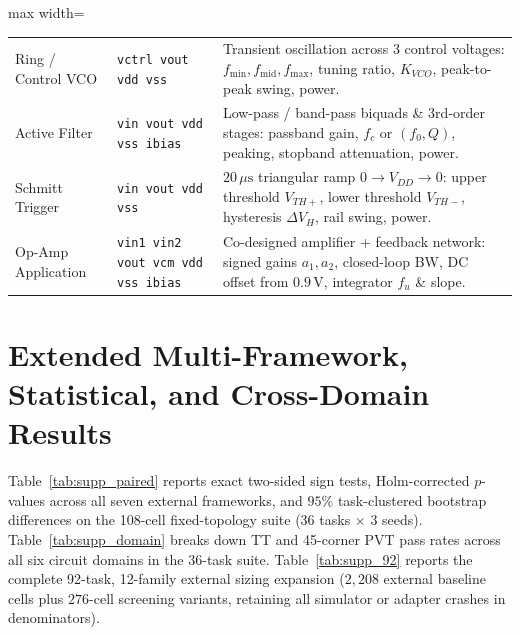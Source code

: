 \begin{table}[ht]
\begin{adjustbox}{max width=\textwidth}
\begin{tabular}{@{}llp{88mm}@{}}
Ring / Control VCO & \texttt{vctrl vout vdd vss} & Transient oscillation across 3 control voltages: $f_{\min}, f_{\text{mid}}, f_{\max}$, tuning ratio, $K_{VCO}$, peak-to-peak swing, power. \\
Active Filter & \texttt{vin vout vdd vss ibias} & Low-pass / band-pass biquads \& 3rd-order stages: passband gain, $f_c$ or $(f_0, Q)$, peaking, stopband attenuation, power. \\
Schmitt Trigger & \texttt{vin vout vdd vss} & $20\,\mu\mathrm{s}$ triangular ramp $0 \to V_{DD} \to 0$: upper threshold $V_{TH+}$, lower threshold $V_{TH-}$, hysteresis $\Delta V_H$, rail swing, power. \\
Op-Amp Application & \texttt{vin1 vin2 vout vcm vdd vss ibias} & Co-designed amplifier + feedback network: signed gains $a_1, a_2$, closed-loop BW, DC offset from $0.9\,\mathrm{V}$, integrator $f_u$ \& slope. \\
\bottomrule
\end{tabular}
\end{adjustbox}
\end{table}

\section{Extended Multi-Framework, Statistical, and Cross-Domain Results}
\label{app:extended}

Table~\ref{tab:supp_paired} reports exact two-sided sign tests, Holm-corrected $p$-values across all seven external frameworks, and $95\%$ task-clustered bootstrap differences on the 108-cell fixed-topology suite (36 tasks $\times$ 3 seeds). Table~\ref{tab:supp_domain} breaks down TT and 45-corner PVT pass rates across all six circuit domains in the 36-task suite. Table~\ref{tab:supp_92} reports the complete 92-task, 12-family external sizing expansion ($2{,}208$ external baseline cells plus $276$-cell screening variants, retaining all simulator or adapter crashes in denominators).


